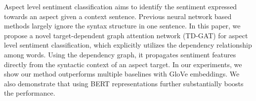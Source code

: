 Aspect level sentiment classiﬁcation aims to identify the sentiment expressed towards an aspect given a context sentence. Previous neural network based methods largely ignore the syntax structure in one sentence. In this paper, we propose a novel target-dependent graph attention network (TD-GAT) for aspect level sentiment classification, which explicitly utilizes the dependency relationship among words. Using the dependency graph, it propagates sentiment features directly from the syntactic context of an aspect target. In our experiments, we show our method outperforms multiple baselines with GloVe embeddings. We also demonstrate that using BERT representations further substantially boosts the performance.